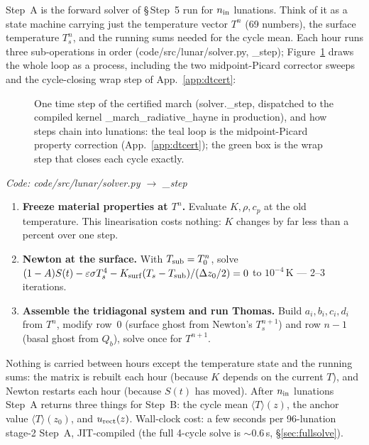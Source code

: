 \documentclass[11pt]{report}
\newcommand{\Tm}{\langle T\rangle}
\newcommand{\code}[1]{{\ttfamily\small #1}}
\begin{document}
Step~A is the forward solver of \S\,Step~5 run for $n_{\rm in}$ lunations. Think
of it as a state machine carrying just the temperature vector $T^n$ (69 numbers),
the surface temperature $T_s^n$, and the running sums needed for the cycle mean.
Each hour runs three sub-operations in order (\code{code/src/lunar/solver.py},
\code{\_step}); Figure~\ref{fig:marchflow} draws the whole loop as a
process, including the two midpoint-Picard corrector sweeps and the
cycle-closing wrap step of App.~\ref{app:dtcert}:

\begin{figure}[htbp]\centering

\caption{One time step of the certified march
(\code{solver.\_step}, dispatched to the compiled kernel
\code{\_march\_radiative\_hayne} in production), and how steps chain
into lunations: the teal loop is the midpoint-Picard property correction
(App.~\ref{app:dtcert}); the green box is the wrap step that closes each
cycle exactly.}
\label{fig:marchflow}
\end{figure}

{\small\color{dim}\textit{Code: \code{code/src/lunar/solver.py} $\to$ \code{\_step}}}

\begin{enumerate}[leftmargin=1.4em,itemsep=3pt]
\item \textbf{Freeze material properties at $T^n$.} Evaluate $K,\rho,c_p$ at the
  old temperature. This linearisation costs nothing: $K$ changes by far
  less than a percent over one step.
\item \textbf{Newton at the surface.} With $T_{\rm sub}=T_0^n$, solve
  $(1-A)S(t)-\varepsilon\sigma T_s^4 - K_{\rm surf}(T_s-T_{\rm sub})/(\Delta z_0/2)=0$
  to $10^{-4}$\,K --- 2--3 iterations.
\item \textbf{Assemble the tridiagonal system and run Thomas.} Build
  $a_i,b_i,c_i,d_i$ from $T^n$, modify row~0 (surface ghost from Newton's
  $T_s^{n+1}$) and row $n{-}1$ (basal ghost from $Q_b$), solve once for
  $T^{n+1}$.
\end{enumerate}

\noindent Nothing is carried between hours except the temperature state and the
running sums: the matrix is rebuilt each hour (because $K$ depends on the current
$T$), and Newton restarts each hour (because $S(t)$ has moved). After
$n_{\rm in}$ lunations Step~A returns three things for Step~B: the cycle mean
$\Tm(z)$, the anchor value $\Tm(z_0)$, and $u_{\rm rect}(z)$. Wall-clock cost:
a few seconds per 96-lunation stage-2 Step~A, JIT-compiled (the full 4-cycle
solve is $\sim$0.6\,s, \S\ref{sec:fullsolve}).
\end{document}
